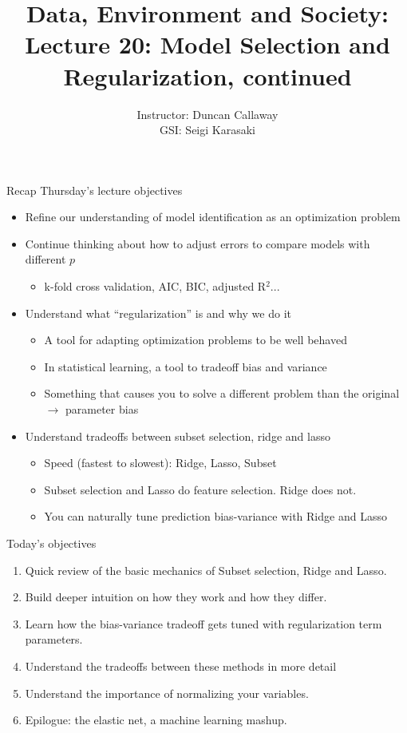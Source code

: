 \documentclass[mathserif, aspectratio=169]{beamer}
\title[Lecture 20] %
{Data, Environment and Society: \\{Lecture 20: Model Selection and Regularization, continued}}
\author[ER190C: Data, Environment and Society] 
{Instructor: Duncan Callaway\\
GSI: Seigi Karasaki}
\institute[UC Berkeley] %
 {\small{ \bf October 30, 2018}}
\date[October 30, 2018]
\begin{document}
\frame{
  \titlepage
}



\begin{frame}{Recap Thursday's lecture objectives}
\begin{itemize}
\item Refine our understanding of model identification as an optimization problem
\item Continue thinking about how to adjust errors to compare models with different $p$
\begin{itemize}
\item<3-> k-fold cross validation, AIC, BIC, adjusted R$^2$...
\end{itemize}
\item Understand what ``regularization'' is and why we do it
\begin{itemize}
\item<4-> A tool for adapting optimization problems to be well behaved
\item<4-> In statistical learning, a tool to tradeoff bias and variance 
\item<4-> Something that causes you to solve a different problem than the original $\rightarrow$ parameter bias
\end{itemize}
\item Understand tradeoffs between subset selection, ridge and lasso
\begin{itemize}
\item<5-> Speed (fastest to slowest): Ridge, Lasso, Subset
\item<5-> Subset selection and Lasso do feature selection.  Ridge does not.
\item<5-> You can naturally tune prediction bias-variance with Ridge and Lasso
\end{itemize}
\end{itemize}
\end{frame}

\begin{frame}{Today's objectives}

\begin{enumerate}
\item Quick review of the basic mechanics of Subset selection, Ridge and Lasso.
\item Build deeper intuition on how they work and how they differ.
\item Learn how the bias-variance tradeoff gets tuned with regularization term parameters. 
\item Understand the tradeoffs between these methods in more detail
\item Understand the importance of normalizing your variables.
\item Epilogue: the elastic net, a machine learning mashup.  
\end{enumerate}

\end{frame}
\end{document}
